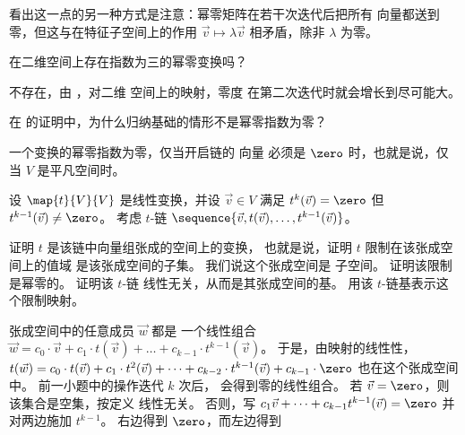 \begin{exercises}
\begin{answer}
       看出这一点的另一种方式是注意：幂零矩阵在若干次迭代后把所有
       向量都送到零，但这与在特征子空间上的作用 $\vec{v}\mapsto \lambda\vec{v}$
       相矛盾，除非
       $\lambda$ 为零。
     \end{answer}
   \item
     在二维空间上存在指数为三的幂零变换吗？
     \begin{answer}
       不存在，由 ，对二维
       空间上的映射，零度
       在第二次迭代时就会增长到尽可能大。
     \end{answer}
   \item
     在  的证明中，为什么归纳基础的情形不是幂零指数为零？
     \begin{answer}
       一个变换的幂零指数为零，仅当开启链的
       向量
       必须是 $\zero$ 时，也就是说，仅当 $V$ 是平凡空间时。
     \end{answer}
   \recommended \item
     设 \( \map{t}{V}{V} \) 是线性变换，并设
     \( \vec{v}\in V \) 满足 \( t^k(\vec{v})=\zero \) 但
     \( t^{k-1}(\vec{v})\neq\zero \)。
     考虑 $t$-链
     $\sequence{\vec{v},t(\vec{v}),\dots,t^{k-1}(\vec{v})}$。
     \begin{exparts}
       \partsitem 证明 \( t \) 是该链中向量组张成的空间上的变换，
         也就是说，证明 \( t\) 限制在该张成空间上的值域
         是该张成空间的子集。
         我们说这个张成空间是 
         子空间。
       \partsitem 证明该限制是幂零的。
       \partsitem 证明该 $t$-链
         线性无关，从而是其张成空间的基。
       \partsitem 用该 $t$-链基表示这个限制映射。
     \end{exparts}
     \begin{answer}
       \begin{exparts}
         \partsitem 张成空间中的任意成员 $\vec{w}$ 都是
           一个线性组合
           $\vec{w}=c_0\cdot \vec{v}+c_1\cdot t(\vec{v})+\dots
            +c_{k-1}\cdot t^{k-1}(\vec{v})$。
           于是，由映射的线性性，
           $t(\vec{w})=c_0\cdot t(\vec{v})+c_1\cdot t^2(\vec{v})+\dots
            +c_{k-2}\cdot t^{k-1}(\vec{v})+c_{k-1}\cdot \zero$
           也在这个张成空间中。
         \partsitem 前一小题中的操作迭代 $k$ 次后，
           会得到零的线性组合。
         \partsitem 若 \( \vec{v}=\zero \)，则该集合是空集，按定义
           线性无关。
           否则，写 \( c_1\vec{v}+\dots+c_{k-1}t^{k-1}(\vec{v})=\zero \)
           并对两边施加 \( t^{k-1} \)。
           右边得到 \( \zero \)，而左边得到

\end{exparts}
\end{answer}
\end{exercises}
